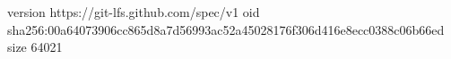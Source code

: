version https://git-lfs.github.com/spec/v1
oid sha256:00a64073906cc865d8a7d56993ac52a45028176f306d416e8ecc0388c06b66ed
size 64021
